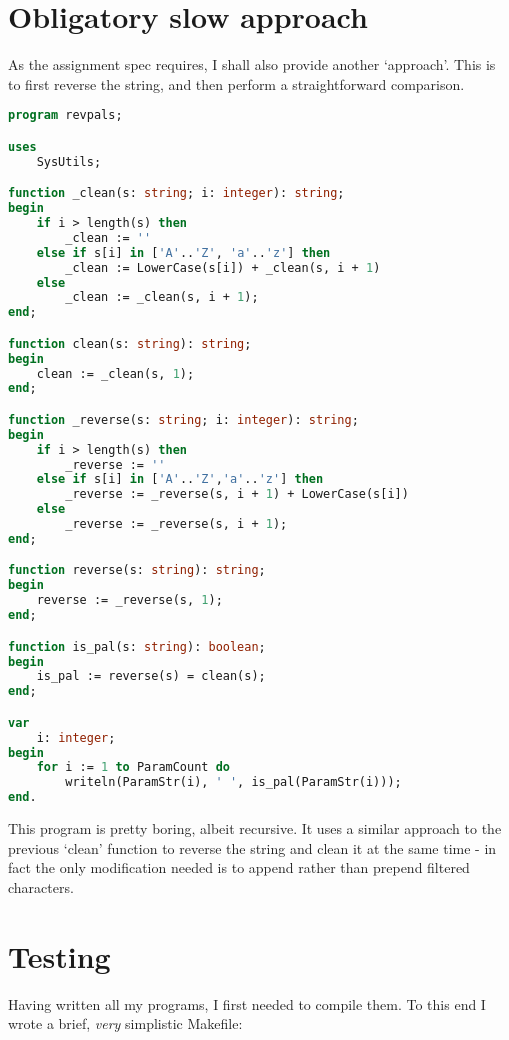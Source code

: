 \documentclass{article}
\begin{document}
    \section{Obligatory slow approach}

    As the assignment spec requires, I shall also provide another `approach'.
    This is to first reverse the string, and then perform a straightforward
    comparison.

\begin{lstlisting}[language=Pascal, caption=Method by string reversal]
program revpals;

uses
    SysUtils;

function _clean(s: string; i: integer): string;
begin
    if i > length(s) then
        _clean := ''
    else if s[i] in ['A'..'Z', 'a'..'z'] then
        _clean := LowerCase(s[i]) + _clean(s, i + 1)
    else
        _clean := _clean(s, i + 1);
end;

function clean(s: string): string;
begin
    clean := _clean(s, 1);
end;

function _reverse(s: string; i: integer): string;
begin
    if i > length(s) then
        _reverse := ''
    else if s[i] in ['A'..'Z','a'..'z'] then
        _reverse := _reverse(s, i + 1) + LowerCase(s[i])
    else
        _reverse := _reverse(s, i + 1);
end;

function reverse(s: string): string;
begin
    reverse := _reverse(s, 1);
end;

function is_pal(s: string): boolean;
begin
    is_pal := reverse(s) = clean(s);
end;

var
    i: integer;
begin
    for i := 1 to ParamCount do
        writeln(ParamStr(i), ' ', is_pal(ParamStr(i)));
end.
\end{lstlisting}

    This program is pretty boring, albeit recursive. It uses a similar approach
    to the previous `clean' function to reverse the string and clean it at the
    same time - in fact the only modification needed is to append rather than
    prepend filtered characters.

    \section{Testing}

    Having written all my programs, I first needed to compile them. To this end
    I wrote a brief, \textit{very} simplistic Makefile:
\end{document}
